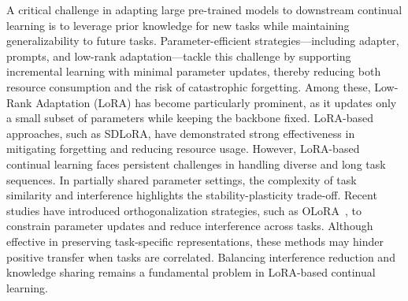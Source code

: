 \documentclass[letterpaper]{article} %
\begin{document}
A critical challenge in adapting large pre-trained models to downstream continual learning is to leverage prior knowledge for new tasks while maintaining generalizability to future tasks. Parameter-efficient strategies—including adapter\cite{pmlr-v97-houlsby19a}, prompts\cite{Wang_2022_CVPR}, and low-rank adaptation—tackle this challenge by supporting incremental learning with minimal parameter updates, thereby reducing both resource consumption and the risk of catastrophic forgetting. Among these, Low-Rank Adaptation (LoRA)\cite{hu2022lora} has become particularly prominent, as it updates only a small subset of parameters while keeping the backbone fixed. LoRA-based approaches, such as SDLoRA\cite{wu2025sdlorascalabledecoupledlowrank}, have demonstrated strong effectiveness in mitigating forgetting and reducing resource usage. 
However, LoRA-based continual learning faces persistent challenges in handling diverse and long task sequences. In partially shared parameter settings, the complexity of task similarity and interference highlights the stability-plasticity trade-off. Recent studies have introduced orthogonalization strategies, such as OLoRA~\cite{NEURIPS2020_70d85f35,wang2023orthogonalsubspacelearninglanguage}, to constrain parameter updates and reduce interference across tasks. Although effective in preserving task-specific representations, these methods may hinder positive transfer when tasks are correlated. Balancing interference reduction and knowledge sharing remains a fundamental problem in LoRA-based continual learning.




\end{document}
